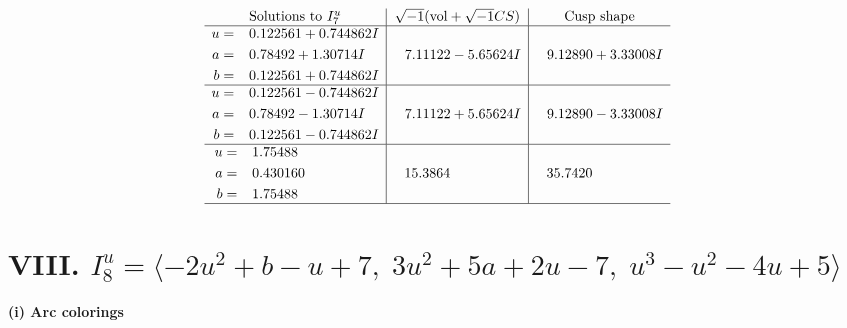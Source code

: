 \documentclass[1p]{elsarticle_modified}
\theoremstyle{definition}
\newcommand{\I}{\sqrt{-1}}
\begin{document}
$$\begin{array}{c|c|c}  
\text{Solutions to }I^u_{7}& \I (\text{vol} + \sqrt{-1}CS) & \text{Cusp shape}\\
 \hline 
\begin{aligned}
u &= \phantom{-}0.122561 + 0.744862 I \\
a &= \phantom{-}0.78492 + 1.30714 I \\
b &= \phantom{-}0.122561 + 0.744862 I\end{aligned}
 & \phantom{-}7.11122 - 5.65624 I & \phantom{-}9.12890 + 3.33008 I \\ \hline\begin{aligned}
u &= \phantom{-}0.122561 - 0.744862 I \\
a &= \phantom{-}0.78492 - 1.30714 I \\
b &= \phantom{-}0.122561 - 0.744862 I\end{aligned}
 & \phantom{-}7.11122 + 5.65624 I & \phantom{-}9.12890 - 3.33008 I \\ \hline\begin{aligned}
u &= \phantom{-}1.75488\phantom{ +0.000000I} \\
a &= \phantom{-}0.430160\phantom{ +0.000000I} \\
b &= \phantom{-}1.75488\phantom{ +0.000000I}\end{aligned}
 & \phantom{-}15.3864\phantom{ +0.000000I} & \phantom{-}35.7420\phantom{ +0.000000I}\\
 \hline 
 \end{array}$$\newpage\newpage\renewcommand{\arraystretch}{1}
\centering \section*{VIII. $I^u_{8}= \langle -2 u^2+b- u+7,\;3 u^2+5 a+2 u-7,\;u^3- u^2-4 u+5 \rangle$}
\flushleft \textbf{(i) Arc colorings}\\
\end{document}
